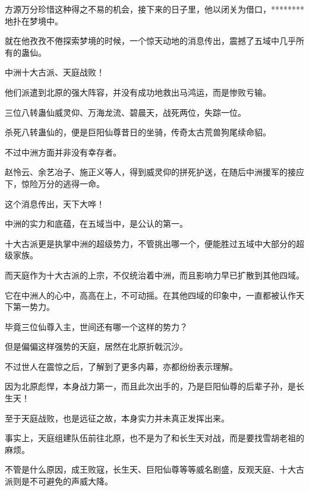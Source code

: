 \begin{this_body}
方源万分珍惜这种得之不易的机会，接下来的日子里，他以闭关为借口，********地扑在梦境中。

就在他孜孜不倦探索梦境的时候，一个惊天动地的消息传出，震撼了五域中几乎所有的蛊仙。

中洲十大古派、天庭战败！

他们派遣到北原的强大阵容，并没有成功地救出马鸿运，而是惨败亏输。

三位八转蛊仙威灵仰、万海龙流、碧晨天，战死两位，失踪一位。

杀死八转蛊仙的，便是巨阳仙尊昔日的坐骑，传奇太古荒兽狗尾续命貂。

不过中洲方面并非没有幸存者。

赵怜云、余艺冶子、施正义等人，得到威灵仰的拼死护送，在随后中洲援军的接应下，惊险万分的逃得一命。

这个消息传出，天下大哗！

中洲的实力和底蕴，在五域当中，是公认的第一。

十大古派更是执掌中洲的超级势力，不管挑出哪一个，便能胜过五域中大部分的超级家族。

而天庭作为十大古派的上宗，不仅统治着中洲，而且影响力早已扩散到其他四域。

它在中洲人的心中，高高在上，不可动摇。在其他四域的印象中，一直都被认作天下第一势力。

毕竟三位仙尊入主，世间还有哪一个这样的势力？

但是偏偏这样强势的天庭，居然在北原折戟沉沙。

不过世人在震惊之后，了解到了更多内幕，亦都纷纷表示理解。

因为北原彪悍，本身战力第一，而且此次出手的，乃是巨阳仙尊的后辈子孙，是长生天！

至于天庭战败，也是远征之故，本身实力并未真正发挥出来。

事实上，天庭组建队伍前往北原，也不是为了和长生天对战，而是要找雪胡老祖的麻烦。

不管是什么原因，成王败寇，长生天、巨阳仙尊等等威名剧盛，反观天庭、十大古派则是不可避免的声威大降。

\end{this_body}

